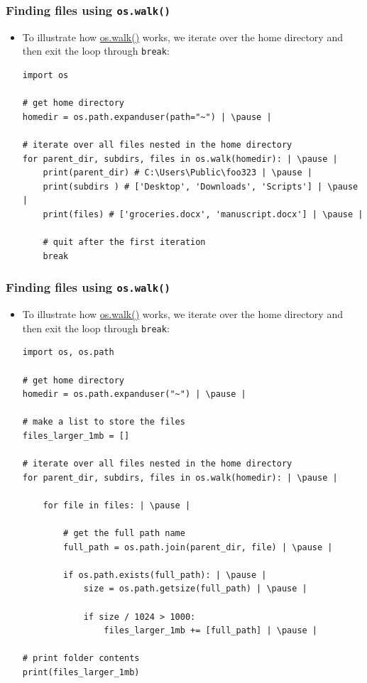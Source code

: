 \documentclass[xcolor=table]{beamer}
\begin{document}
\begin{frame}[fragile]
    \frametitle{Finding files using \texttt{os.walk()}}
    \begin{itemize}
        \item To illustrate how \href{https://docs.python.org/3.7/library/os.html#os.walk}{os.walk()} works, we iterate over the home directory and then exit the loop through \texttt{break}:
\begin{lstlisting}[style=python]
import os 

# get home directory
homedir = os.path.expanduser(path="~") | \pause |

# iterate over all files nested in the home directory
for parent_dir, subdirs, files in os.walk(homedir): | \pause |
    print(parent_dir) # C:\Users\Public\foo323 | \pause |
    print(subdirs ) # ['Desktop', 'Downloads', 'Scripts'] | \pause |
    print(files) # ['groceries.docx', 'manuscript.docx'] | \pause |

    # quit after the first iteration
    break

\end{lstlisting}
    \end{itemize}
\end{frame}

\begin{frame}[fragile]
    \frametitle{Finding files using \texttt{os.walk()}}
    \begin{itemize}
        \item To illustrate how \href{https://docs.python.org/3.7/library/os.html#os.walk}{os.walk()} works, we iterate over the home directory and then exit the loop through \texttt{break}:
\begin{lstlisting}[style=pythonsmall]
import os, os.path

# get home directory
homedir = os.path.expanduser("~") | \pause |

# make a list to store the files
files_larger_1mb = []

# iterate over all files nested in the home directory
for parent_dir, subdirs, files in os.walk(homedir): | \pause |

    for file in files: | \pause |

        # get the full path name
        full_path = os.path.join(parent_dir, file) | \pause |

        if os.path.exists(full_path): | \pause |
            size = os.path.getsize(full_path) | \pause |

            if size / 1024 > 1000:
                files_larger_1mb += [full_path] | \pause |

# print folder contents
print(files_larger_1mb)
\end{lstlisting}
    \end{itemize}
\end{frame}
\end{document}

